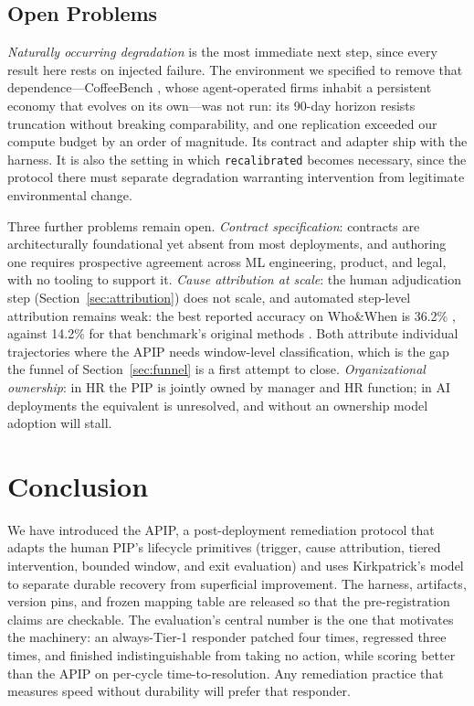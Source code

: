 \documentclass[conference]{IEEEtran}
\newcommand{\code}[1]{\texttt{\small #1}}
\begin{document}
\subsection{Open Problems}
\label{sec:open}

\emph{Naturally occurring degradation} is the most immediate next step, since
every result here rests on injected failure. The environment we specified to
remove that dependence---CoffeeBench \cite{coffeebench2026}, whose
agent-operated firms inhabit a persistent economy that evolves on its own---was
not run: its 90-day horizon resists truncation without breaking comparability,
and one replication exceeded our compute budget by an order of magnitude. Its
contract and adapter ship with the harness. It is also the setting in which
\code{recalibrated} becomes necessary, since the protocol there must separate
degradation warranting intervention from legitimate environmental change.

Three further problems remain open. \emph{Contract specification}: contracts
are architecturally foundational yet absent from most deployments, and
authoring one requires prospective agreement across ML engineering, product,
and legal, with no tooling to support it. \emph{Cause attribution at scale}:
the human adjudication step (Section~\ref{sec:attribution}) does not scale, and
automated step-level attribution remains weak: the best reported accuracy on
Who\&When is 36.2\% \cite{ma2025attribution}, against 14.2\% for that
benchmark's original methods \cite{zhang2025}. Both attribute individual
trajectories where the APIP needs window-level classification, which is the gap
the funnel of Section~\ref{sec:funnel} is a first attempt to close.
\emph{Organizational ownership}: in HR the PIP is jointly owned by manager and
HR function; in AI deployments the equivalent is unresolved, and without an
ownership model adoption will stall.

\section{Conclusion}

We have introduced the APIP, a post-deployment remediation protocol that adapts
the human PIP's lifecycle primitives (trigger, cause attribution, tiered
intervention, bounded window, and exit evaluation) and uses Kirkpatrick's model
to separate durable recovery from superficial improvement. The harness,
artifacts, version pins, and frozen mapping table are released so that the
pre-registration claims are checkable. The evaluation's central number is the
one that motivates the machinery: an always-Tier-1 responder patched four
times, regressed three times, and finished indistinguishable from taking no
action, while scoring better than the APIP on per-cycle time-to-resolution. Any
remediation practice that measures speed without durability will prefer that
responder.
\end{document}
